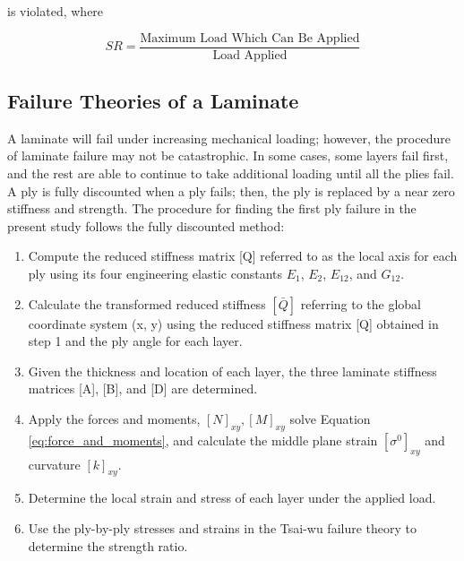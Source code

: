 \documentclass[USenglish,twocolumn]{article}
\begin{document}
is violated, where

\begin{equation} \label{eq:sr}S R=\frac{\text {Maximum Load Which Can Be Applied}}{\text {Load Applied}}
\end{equation}


\subsection{Failure Theories of a Laminate}
A laminate will fail under increasing mechanical loading; however, the procedure of laminate failure may not
be catastrophic.%
 In some cases, some layers fail first, and the rest are able to continue to take additional loading
 until all the plies fail. A ply is fully discounted when a ply fails; then, the ply is replaced
by a near zero stiffness and strength. %
The procedure for finding the first ply failure in the present
study follows the fully discounted method:

\begin{enumerate}
\item Compute the reduced stiffness matrix [Q] referred to as the local axis for each ply using its four engineering elastic constants $E_1 $, $E_2 $, $E_{12} $, and $G_{12} $.

\item Calculate the transformed reduced stiffness $[\bar{Q}] $ referring to the global coordinate system (x, y) using the reduced stiffness matrix [Q] obtained in step 1 and the ply angle for each layer.

\item  Given the thickness and location of each layer, the three laminate stiffness matrices [A], [B], and [D] are determined.

\item  Apply the forces and moments, $[N]_{xy}, [M]_{xy} $ solve
Equation \ref{eq:force_and_moments}, and calculate the middle plane strain $[\sigma ^{0}]_{xy} $ and curvature $[k]_{xy} $.

\item Determine the local strain and stress of each layer under the applied load.

\item  Use the ply-by-ply stresses and strains in the Tsai-wu failure theory to determine the strength ratio.
\end{enumerate}
\end{document}
